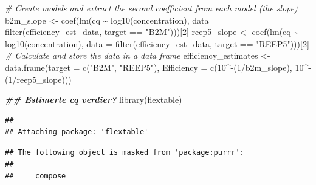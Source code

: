 \documentclass[
]{book}
\newenvironment{Shaded}{\begin{snugshade}}{\end{snugshade}}
\newcommand{\AttributeTok}[1]{\textcolor[rgb]{0.77,0.63,0.00}{#1}}
\newcommand{\CommentTok}[1]{\textcolor[rgb]{0.56,0.35,0.01}{\textit{#1}}}
\newcommand{\DecValTok}[1]{\textcolor[rgb]{0.00,0.00,0.81}{#1}}
\newcommand{\DocumentationTok}[1]{\textcolor[rgb]{0.56,0.35,0.01}{\textbf{\textit{#1}}}}
\newcommand{\FunctionTok}[1]{\textcolor[rgb]{0.00,0.00,0.00}{#1}}
\newcommand{\NormalTok}[1]{#1}
\newcommand{\OtherTok}[1]{\textcolor[rgb]{0.56,0.35,0.01}{#1}}
\newcommand{\SpecialCharTok}[1]{\textcolor[rgb]{0.00,0.00,0.00}{#1}}
\newcommand{\StringTok}[1]{\textcolor[rgb]{0.31,0.60,0.02}{#1}}
\begin{document}
\begin{Shaded}
\begin{Highlighting}[]
 \CommentTok{\# Create models and extract the second coefficient from each model (the slope)}
\NormalTok{b2m\_slope }\OtherTok{\textless{}{-}} \FunctionTok{coef}\NormalTok{(}\FunctionTok{lm}\NormalTok{(cq }\SpecialCharTok{\textasciitilde{}} \FunctionTok{log10}\NormalTok{(concentration), }\AttributeTok{data =} \FunctionTok{filter}\NormalTok{(efficiency\_est\_data, target }\SpecialCharTok{==} \StringTok{"B2M"}\NormalTok{)))[}\DecValTok{2}\NormalTok{]}
\NormalTok{reep5\_slope }\OtherTok{\textless{}{-}} \FunctionTok{coef}\NormalTok{(}\FunctionTok{lm}\NormalTok{(cq }\SpecialCharTok{\textasciitilde{}} \FunctionTok{log10}\NormalTok{(concentration), }\AttributeTok{data =} \FunctionTok{filter}\NormalTok{(efficiency\_est\_data, target }\SpecialCharTok{==} \StringTok{"REEP5"}\NormalTok{)))[}\DecValTok{2}\NormalTok{]}
\CommentTok{\# Calculate and store the data in a data frame}
\NormalTok{efficiency\_estimates }\OtherTok{\textless{}{-}} \FunctionTok{data.frame}\NormalTok{(}\AttributeTok{target =} \FunctionTok{c}\NormalTok{(}\StringTok{"B2M"}\NormalTok{, }\StringTok{"REEP5"}\NormalTok{), }
           \AttributeTok{Efficiency =} \FunctionTok{c}\NormalTok{(}\DecValTok{10}\SpecialCharTok{\^{}{-}}\NormalTok{(}\DecValTok{1}\SpecialCharTok{/}\NormalTok{b2m\_slope), }
                          \DecValTok{10}\SpecialCharTok{\^{}{-}}\NormalTok{(}\DecValTok{1}\SpecialCharTok{/}\NormalTok{reep5\_slope)))}
\end{Highlighting}
\end{Shaded}

\begin{Shaded}
\begin{Highlighting}[]
\DocumentationTok{\#\# Estimerte cq verdier? }
\FunctionTok{library}\NormalTok{(flextable)}
\end{Highlighting}
\end{Shaded}

\begin{verbatim}
## 
## Attaching package: 'flextable'
\end{verbatim}

\begin{verbatim}
## The following object is masked from 'package:purrr':
## 
##     compose
\end{verbatim}
\end{document}
